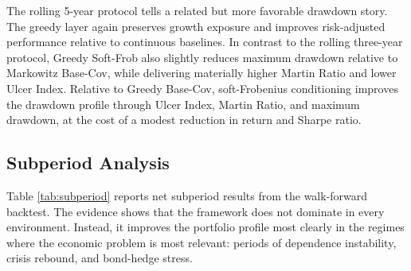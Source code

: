 \documentclass[11pt]{article}
\begin{document}
The rolling 5-year protocol tells a related but more favorable drawdown story. The greedy layer again preserves growth exposure and improves risk-adjusted performance relative to continuous baselines. In contrast to the rolling three-year protocol, Greedy Soft-Frob also slightly reduces maximum drawdown relative to Markowitz Base-Cov, while delivering materially higher Martin Ratio and lower Ulcer Index. Relative to Greedy Base-Cov, soft-Frobenius conditioning improves the drawdown profile through Ulcer Index, Martin Ratio, and maximum drawdown, at the cost of a modest reduction in return and Sharpe ratio.

\subsection{Subperiod Analysis}

Table \ref{tab:subperiod} reports net subperiod results from the walk-forward backtest. The evidence shows that the framework does not dominate in every environment. Instead, it improves the portfolio profile most clearly in the regimes where the economic problem is most relevant: periods of dependence instability, crisis rebound, and bond-hedge stress.
\end{document}
